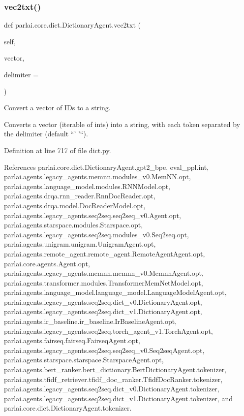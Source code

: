 \subsubsection{\texorpdfstring{vec2txt()}{vec2txt()}}
{\footnotesize\ttfamily def parlai.\+core.\+dict.\+Dictionary\+Agent.\+vec2txt (\begin{DoxyParamCaption}\item[{}]{self,  }\item[{}]{vector,  }\item[{}]{delimiter = {\ttfamily \textquotesingle{}~\textquotesingle{}} }\end{DoxyParamCaption})}

\begin{DoxyVerb}Convert a vector of IDs to a string.

Converts a vector (iterable of ints) into a string, with each token
separated by the delimiter (default ``' '``).
\end{DoxyVerb}
 

Definition at line 717 of file dict.\+py.



References parlai.\+core.\+dict.\+Dictionary\+Agent.\+gpt2\+\_\+bpe, eval\+\_\+ppl.\+int, parlai.\+agents.\+legacy\+\_\+agents.\+memnn.\+modules\+\_\+v0.\+Mem\+N\+N.\+opt, parlai.\+agents.\+language\+\_\+model.\+modules.\+R\+N\+N\+Model.\+opt, parlai.\+agents.\+drqa.\+rnn\+\_\+reader.\+Rnn\+Doc\+Reader.\+opt, parlai.\+agents.\+drqa.\+model.\+Doc\+Reader\+Model.\+opt, parlai.\+agents.\+legacy\+\_\+agents.\+seq2seq.\+seq2seq\+\_\+v0.\+Agent.\+opt, parlai.\+agents.\+starspace.\+modules.\+Starspace.\+opt, parlai.\+agents.\+legacy\+\_\+agents.\+seq2seq.\+modules\+\_\+v0.\+Seq2seq.\+opt, parlai.\+agents.\+unigram.\+unigram.\+Unigram\+Agent.\+opt, parlai.\+agents.\+remote\+\_\+agent.\+remote\+\_\+agent.\+Remote\+Agent\+Agent.\+opt, parlai.\+core.\+agents.\+Agent.\+opt, parlai.\+agents.\+legacy\+\_\+agents.\+memnn.\+memnn\+\_\+v0.\+Memnn\+Agent.\+opt, parlai.\+agents.\+transformer.\+modules.\+Transformer\+Mem\+Net\+Model.\+opt, parlai.\+agents.\+language\+\_\+model.\+language\+\_\+model.\+Language\+Model\+Agent.\+opt, parlai.\+agents.\+legacy\+\_\+agents.\+seq2seq.\+dict\+\_\+v0.\+Dictionary\+Agent.\+opt, parlai.\+agents.\+legacy\+\_\+agents.\+seq2seq.\+dict\+\_\+v1.\+Dictionary\+Agent.\+opt, parlai.\+agents.\+ir\+\_\+baseline.\+ir\+\_\+baseline.\+Ir\+Baseline\+Agent.\+opt, parlai.\+agents.\+legacy\+\_\+agents.\+seq2seq.\+torch\+\_\+agent\+\_\+v1.\+Torch\+Agent.\+opt, parlai.\+agents.\+fairseq.\+fairseq.\+Fairseq\+Agent.\+opt, parlai.\+agents.\+legacy\+\_\+agents.\+seq2seq.\+seq2seq\+\_\+v0.\+Seq2seq\+Agent.\+opt, parlai.\+agents.\+starspace.\+starspace.\+Starspace\+Agent.\+opt, parlai.\+agents.\+bert\+\_\+ranker.\+bert\+\_\+dictionary.\+Bert\+Dictionary\+Agent.\+tokenizer, parlai.\+agents.\+tfidf\+\_\+retriever.\+tfidf\+\_\+doc\+\_\+ranker.\+Tfidf\+Doc\+Ranker.\+tokenizer, parlai.\+agents.\+legacy\+\_\+agents.\+seq2seq.\+dict\+\_\+v0.\+Dictionary\+Agent.\+tokenizer, parlai.\+agents.\+legacy\+\_\+agents.\+seq2seq.\+dict\+\_\+v1.\+Dictionary\+Agent.\+tokenizer, and parlai.\+core.\+dict.\+Dictionary\+Agent.\+tokenizer.



